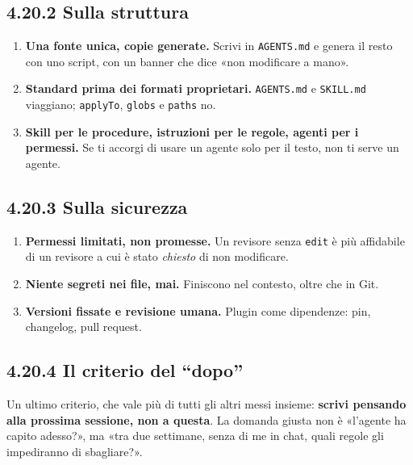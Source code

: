 \documentclass[
  italian,
  10pt,
]{book}
\providecommand{\tightlist}{%
  \setlength{\itemsep}{0pt}\setlength{\parskip}{0pt}}
\begin{document}
\subsection{4.20.2 Sulla struttura}\label{sulla-struttura}

\begin{enumerate}
\def\labelenumi{\arabic{enumi}.}
\setcounter{enumi}{4}
\tightlist
\item
  \textbf{Una fonte unica, copie generate.} Scrivi in \texttt{AGENTS.md}
  e genera il resto con uno script, con un banner che dice «non
  modificare a mano».
\item
  \textbf{Standard prima dei formati proprietari.} \texttt{AGENTS.md} e
  \texttt{SKILL.md} viaggiano; \texttt{applyTo}, \texttt{globs} e
  \texttt{paths} no.
\item
  \textbf{Skill per le procedure, istruzioni per le regole, agenti per i
  permessi.} Se ti accorgi di usare un agente solo per il testo, non ti
  serve un agente.
\end{enumerate}

\subsection{4.20.3 Sulla sicurezza}\label{sulla-sicurezza}

\begin{enumerate}
\def\labelenumi{\arabic{enumi}.}
\setcounter{enumi}{7}
\tightlist
\item
  \textbf{Permessi limitati, non promesse.} Un revisore senza
  \texttt{edit} è più affidabile di un revisore a cui è stato
  \emph{chiesto} di non modificare.
\item
  \textbf{Niente segreti nei file, mai.} Finiscono nel contesto, oltre
  che in Git.
\item
  \textbf{Versioni fissate e revisione umana.} Plugin come dipendenze:
  pin, changelog, pull request.
\end{enumerate}

\subsection{4.20.4 Il criterio del ``dopo''}\label{il-criterio-del-dopo}

Un ultimo criterio, che vale più di tutti gli altri messi insieme:
\textbf{scrivi pensando alla prossima sessione, non a questa}. La
domanda giusta non è «l'agente ha capito adesso?», ma «tra due
settimane, senza di me in chat, quali regole gli impediranno di
sbagliare?».
\end{document}
